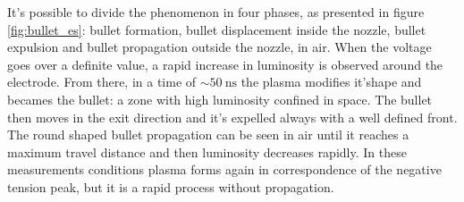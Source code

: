 It's possible to divide the phenomenon in four phases, as presented in figure \ref{fig:bullet_es}: bullet formation, bullet displacement inside the nozzle, bullet expulsion and bullet propagation outside the nozzle, in air. %
When the voltage goes over a definite value, a rapid increase in luminosity is observed around the electrode. From there, in a time of $\sim \SI{50}{\nano\second}$ the plasma modifies it'shape and becames the bullet: a zone with high luminosity confined in space. The bullet then moves in the exit direction and it's expelled always with a well defined front. The round shaped bullet propagation can be seen in air until it reaches a maximum travel distance and then luminosity decreases rapidly. In these measurements conditions plasma forms again in correspondence of the negative tension peak, but it is a rapid process without propagation.
